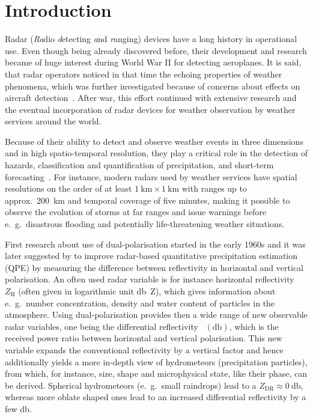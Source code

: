 
\chapter{Introduction}
\label{sec:intro}

Radar (\emph{Ra}dio \emph{d}etecting \emph{a}nd \emph{r}anging) devices have a long history in operational use. Even though being already discovered before, their development and research became of huge interest during World War II for detecting aeroplanes. It is said, that radar operators noticed in that time the echoing properties of weather phenomena, which was further investigated because of concerns about effects on aircraft detection~\cite{doviak_doppler_1993}.
After war, this effort continued with extensive research and the eventual incorporation of radar devices for weather observation by weather services around the world.

Because of their ability to detect and observe weather events in three dimensions and in high spatio-temporal resolution, they play a critical role in the detection of hazards, classification and quantification of precipitation, and short-term forecasting~\cite{zhangWeatherPola}.
For instance, modern radars used by weather services have spatial resolutions
on the order of at least $\SI{1}{\kilo\metre} \times \SI{1}{\kilo\metre}$ with ranges up to approx.\ \SI{200}{\kilo\metre} and temporal coverage of five minutes, making it possible to observe the evolution of storms at far ranges and issue warnings before e.\ g.\ disastrous flooding and potentially life-threatening weather situations.

First research about use of dual-polarisation started in the early 1960s and it was later suggested by \textcite{seliga1976potential} to improve radar-based quantitative precipitation estimation (QPE) by measuring the difference between reflectivity in horizontal and vertical polarisation. An often used radar variable is for instance horizontal reflectivity $Z_\text{H}$ (often given in logarithmic unit \si{\decibel Z}), which gives information about e.\ g.\ number concentration, density and water content of particles in the atmosphere. 
Using dual-polarisation provides then a wide range of new observable radar variables, one being the differential reflectivity \zdr~$(\si{\decibel})$, which is the received power ratio between horizontal and vertical polarisation.
This new variable expands the conventional reflectivity by a vertical factor and hence additionally yields a more in-depth view of hydrometeors (precipitation particles), from which, for instance, size, shape and microphysical state, like their phase, can be derived. 
Spherical hydrometeors (e.\ g.\ small raindrops) lead to a $Z_\text{DR} \approx \SI{0}{\decibel}$, whereas more oblate shaped ones lead to an increased differential reflectivity by a few \si{\decibel}.

